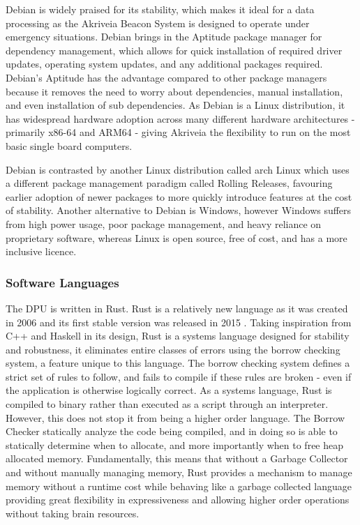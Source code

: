 \bigskip
Debian is widely praised for its stability, which makes it ideal for a data processing as the Akriveia Beacon System is designed to operate under emergency situations. Debian brings in the \Gls{Aptitude} package manager for dependency management, which allows for quick installation of required driver updates, operating system updates, and any additional packages required.
Debian's Aptitude has the advantage compared to other package managers because it removes the need to worry about dependencies, manual installation, and even installation of sub dependencies.
As Debian is a Linux distribution, it has widespread hardware adoption across many different hardware architectures - primarily \Gls{x86-64} and \Gls{ARM64} - giving Akriveia the flexibility to run on the most basic single board computers.

\bigskip
Debian is contrasted by another Linux distribution called arch Linux which uses a different package management paradigm called \Gls{Rolling Releases}, favouring earlier adoption of newer packages to more quickly introduce features at the cost of stability. Another alternative to Debian is Windows, however Windows suffers from high power usage, poor package management, and heavy reliance on proprietary software, whereas Linux is open source, free of cost, and has a more inclusive licence.

\pagebreak
\subsubsection{Software Languages}
\medskip
The DPU is written in \Gls{Rust}.
Rust is a relatively new language as it was created in 2006 \cite{rust_graydon_interview} and its first stable version was released in 2015 \cite{rust_releases}. Taking inspiration from C++ and Haskell in its design,
Rust is a systems language designed for stability and robustness, it eliminates entire classes of errors using the borrow checking system, a feature unique to this language.
The borrow checking system defines a strict set of rules to follow, and fails to compile if these rules are broken - even if the application is otherwise logically correct.
As a systems language, Rust is compiled to binary rather than executed as a script through an interpreter. However, this does not stop it from being a higher order language.
The \Gls{Borrow Checker} statically analyze the code being compiled, and in doing so is able to statically determine when to allocate, and more importantly when to free heap allocated memory.
Fundamentally, this means that without a \Gls{Garbage Collector} and without manually managing memory, Rust provides a mechanism to manage memory without a runtime cost while behaving like a garbage collected language providing great flexibility in expressiveness and allowing higher order operations without taking brain resources.

